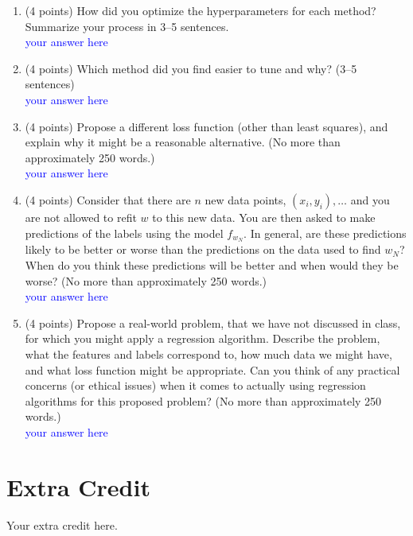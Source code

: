 \documentclass{article}
\begin{document}
\begin{enumerate}
    \item (4 points) How did you optimize the hyperparameters for each method? Summarize your process in 3--5 sentences. \\
    
    \textcolor{blue}{your answer here}
    
    
    \item (4 points) Which method did you find easier to tune and why? (3--5 sentences) \\
    
    \textcolor{blue}{your answer here}
    
    \item (4 points) Propose a different loss function (other than least squares), and explain why it might be a reasonable alternative. (No more than approximately 250 words.)\\
    
    \textcolor{blue}{your answer here}
    
    \newpage
    \item (4 points) Consider that there are $n$ new data points, $(x_i, y_i), \dotsc$ and you are not allowed to refit $w$ to this new data. You are then asked to make predictions of the labels using the model $f_{w_N}$. In general, are these predictions likely to be better or worse than the predictions on the data used to find $w_N$? When do you think these predictions will be better and when would they be worse? (No more than approximately 250 words.)\\
    
    \textcolor{blue}{your answer here}
    
    \item (4 points) Propose a real-world problem, that we have not discussed in class, for which you might apply a regression algorithm. Describe the problem, what the features and labels correspond to, how much data we might have, and what loss function might be appropriate. Can you think of any practical concerns (or ethical issues) when it comes to actually using regression algorithms for this proposed problem? (No more than approximately 250 words.)
    \\
    
    \textcolor{blue}{your answer here}
    
\end{enumerate}

\newpage
\section{Extra Credit}

Your extra credit here. 
\end{document}
